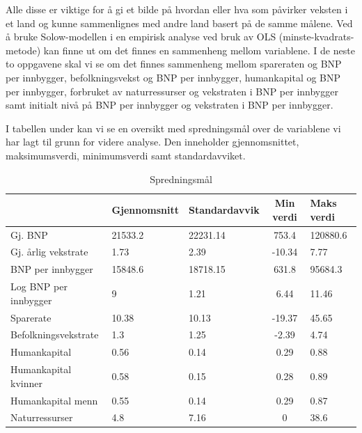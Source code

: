 \documentclass[
  12pt,
  a4paper,
  DIV=11,
  numbers=noendperiod]{scrartcl}
\begin{document}
Alle disse er viktige for å gi et bilde på hvordan eller hva som
påvirker veksten i et land og kunne sammenlignes med andre land basert
på de samme målene. Ved å bruke Solow-modellen i en empirisk analyse ved
bruk av OLS (minste-kvadrats-metode) kan finne ut om det finnes en
sammenheng mellom variablene. I de neste to oppgavene skal vi se om det
finnes sammenheng mellom spareraten og BNP per innbygger,
befolkningsvekst og BNP per innbygger, humankapital og BNP per
innbygger, forbruket av naturressurser og vekstraten i BNP per innbygger
samt initialt nivå på BNP per innbygger og vekstraten i BNP per
innbygger.

I tabellen under kan vi se en oversikt med spredningsmål over de
variablene vi har lagt til grunn for videre analyse. Den inneholder
gjennomsnittet, maksimumsverdi, minimumsverdi samt standardavviket.

\begin{table}[h]
\centering
\begin{tabular}{|l|p{2.8cm}|p{3cm}|c|p{2cm}|}
   \hline
   \rowcolor{cornflowerblue}
  & \textbf{Gjennomsnitt} & \textbf{Standardavvik} & \textbf{Min verdi} & \textbf{Maks verdi} \\
  \hline
    \rowcolor{darkgrey}
  Gj. BNP & 21533.2 & 22231.14 & 753.4 & 120880.6 \\
    \hline
      \rowcolor{darkgrey}
  Gj. årlig vekstrate & 1.73 & 2.39 & -10.34 & 7.77 \\
    \hline
      \rowcolor{darkgrey}
  BNP per innbygger & 15848.6 & 18718.15 & 631.8 & 95684.3 \\
    \hline
      \rowcolor{darkgrey}
  Log BNP per innbygger & 9 & 1.21 & 6.44 & 11.46 \\
      \hline
        \rowcolor{darkgrey}
  Sparerate & 10.38 & 10.13 & -19.37 & 45.65 \\
  \hline
    \rowcolor{darkgrey}
  Befolkningsvekstrate & 1.3 & 1.25 & -2.39 & 4.74 \\
      \hline
        \rowcolor{darkgrey}
  Humankapital & 0.56 & 0.14 & 0.29 & 0.88 \\
      \hline
        \rowcolor{darkgrey}
  Humankapital kvinner & 0.58 & 0.15 & 0.28 & 0.89 \\
      \hline
        \rowcolor{darkgrey}
  Humankapital menn & 0.55 & 0.14 & 0.29 & 0.87 \\
      \hline
        \rowcolor{darkgrey}
  Naturressurser & 4.8 & 7.16 & 0 & 38.6 \\
  \hline
\end{tabular}
\caption{Spredningsmål}
\label{table:Spredningsmål}
\end{table}
\end{document}
